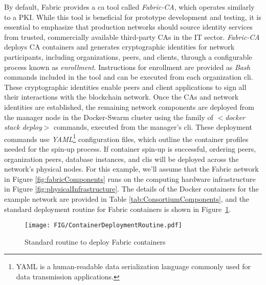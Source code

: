 \documentclass[conference]{IEEEtran}
\begin{document}
By default, Fabric provides a \ac{ca} tool called \textit{Fabric-CA}, which operates similarly to a PKI. While this tool is beneficial for prototype development and testing, it is essential to emphasize that production networks should source identity services from trusted, commercially available third-party CAs in the IT sector. \textit{Fabric-CA} deploys CA containers and generates cryptographic identities for network participants, including organizations, peers, and clients, through a configurable process known as \textit{enrollment}. Instructions for enrollment are provided as \textit{Bash} commands included in the tool and can be executed from each organization \ac{cli}. These cryptographic identities enable peers and client applications to sign all their interactions with the blockchain network. Once the CAs and network identities are established, the remaining network components are deployed from the manager node in the Docker-Swarm cluster using the family of \textit{$<$docker stack deploy$>$} commands, executed from the manager's \ac{cli}.  These deployment commands use \textit{YAML}\footnote{YAML is a human-readable data serialization language commonly used for data transmission applications.} configuration files, which outline the container profiles needed for the spin-up process. If container spin-up is successful, ordering peers, organization peers, database instances, and \ac{cli}s will be deployed across the network's physical nodes. For this example, we'll assume that the Fabric network in Figure \ref{fig:fabricComponents} runs on the computing hardware infrastructure in Figure \ref{fig:physicalInfrastructure}. The details of the Docker containers for the example network are provided in Table \ref{tab:ConsortiumComponents}, and the standard deployment routine for Fabric containers is shown in Figure~\ref{fig:ContainerDeploymentRoutine}.
%
\begin{figure}
    \centering
    \texttt{[image: FIG/ContainerDeploymentRoutine.pdf]}
    \caption{Standard routine to deploy Fabric containers}
    \label{fig:ContainerDeploymentRoutine}
\end{figure}
%
\end{document}
